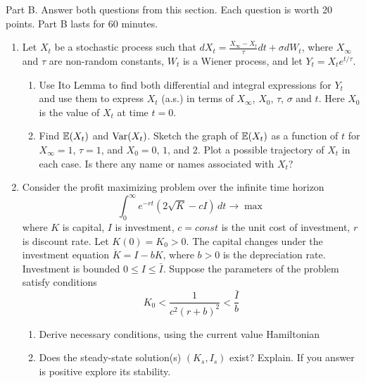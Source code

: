 \documentclass[12pt, a4paper]{article}
\begin{document}
Part B.
Answer both questions from this section. Each question is worth 20 points.
Part B lasts for 60 minutes.
\begin{enumerate}[resume]
\item Let $X_t$ be a stochastic process such that
$dX_t=\frac{X_{\infty}-X_t}{\tau}dt+\sigma dW_t$, where $X_{\infty}$ and $\tau$ are non-random constants, $W_t$ is a Wiener process, and let $Y_t=X_t e^{t/\tau}$.
\begin{enumerate}
\item Use Ito Lemma to find both differential and integral expressions for $Y_t$ and use them to express $X_t$ (a.s.) in terms of $X_{\infty}$, $X_0$, $\tau$, $\sigma$ and $t$. Here $X_0$ is the value of $X_t$ at time $t=0$.
\item Find $\mathbb{E}(X_t)$ and $\operatorname{Var}(X_t)$. Sketch the graph of $\mathbb{E}(X_t)$ as a function of $t$ for $X_{\infty}=1$, $\tau=1$, and $X_0 = 0$, $1$, and $2$. Plot a possible trajectory of $X_t$ in each case. Is there any name or names associated with $X_t$?
\end{enumerate}

\item Consider the profit maximizing problem over the infinite time horizon
\[
\int_0^{\infty} e^{-rt}(2\sqrt{K}-cI)\, dt \to \max
\]
where $K$ is capital, $I$ is investment, $c=const$ is the unit cost of investment, $r$ is discount rate. Let $K(0)=K_0>0$. The capital changes under the investment equation $\dot{K}=I-bK$, where $b>0$ is the depreciation rate. Investment is bounded $0\leq I\leq \bar{I}$. Suppose the parameters of the problem satisfy conditions
\[
K_0 < \frac{1}{c^2(r+b)^2} < \frac{\bar{I}}{b}
\]
\begin{enumerate}
\item Derive necessary conditions, using the current value Hamiltonian
\item Does the steady-state solution(s) $(K_s,I_s)$ exist? Explain. If you answer is positive explore its stability.
\end{enumerate}

\end{enumerate}
\end{document}
